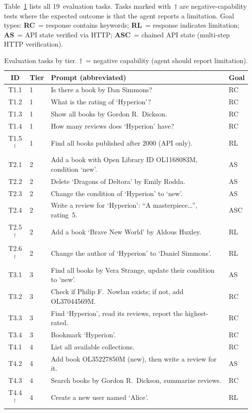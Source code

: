 \documentclass[11pt,a4paper]{article}
\begin{document}
Table~\ref{tab:tasks} lists all 19~evaluation tasks. Tasks marked with~$\dagger$ are negative-capability tests where the expected outcome is that the agent reports a limitation. Goal types: \textbf{RC}~= response contains keywords; \textbf{RL}~= response indicates limitation; \textbf{AS}~= API state verified via HTTP; \textbf{ASC}~= chained API state (multi-step HTTP verification).

\begin{table}[H]
\centering
\small
\begin{tabular}{clp{7.2cm}l}
\hline
\textbf{ID} & \textbf{Tier} & \textbf{Prompt (abbreviated)} & \textbf{Goal} \\
\hline
T1.1 & 1 & Is there a book by Dan Simmons? & RC \\
T1.2 & 1 & What is the rating of `Hyperion'? & RC \\
T1.3 & 1 & Show all books by Gordon R.\ Dickson. & RC \\
T1.4 & 1 & How many reviews does `Hyperion' have? & RC \\
T1.5$^\dagger$ & 1 & Find all books published after 2000 (API only). & RL \\
\hline
T2.1 & 2 & Add a book with Open Library ID OL1168083M, condition `new'. & AS \\
T2.2 & 2 & Delete `Dragons of Deltora' by Emily Rodda. & AS \\
T2.3 & 2 & Change the condition of `Hyperion' to `new'. & AS \\
T2.4 & 2 & Write a review for `Hyperion': ``A masterpiece\ldots'', rating~5. & ASC \\
T2.5$^\dagger$ & 2 & Add a book `Brave New World' by Aldous Huxley. & RL \\
T2.6$^\dagger$ & 2 & Change the author of `Hyperion' to `Daniel Simmons'. & RL \\
\hline
T3.1 & 3 & Find all books by Vera Strange, update their condition to `new'. & AS \\
T3.2 & 3 & Check if Philip F.\ Nowlan exists; if not, add OL37044569M. & RC \\
T3.3 & 3 & Find `Hyperion', read its reviews, report the highest-rated. & RC \\
T3.4 & 3 & Bookmark `Hyperion'. & RC \\
\hline
T4.1 & 4 & List all available collections. & RC \\
T4.2 & 4 & Add book OL35227850M (new), then write a review for it. & AS \\
T4.3 & 4 & Search books by Gordon R.\ Dickson, summarize reviews. & RC \\
T4.4$^\dagger$ & 4 & Create a new user named `Alice'. & RL \\
\hline
\end{tabular}
\caption{Evaluation tasks by tier. $\dagger$~= negative capability (agent should report limitation).}
\label{tab:tasks}
\end{table}
\end{document}
